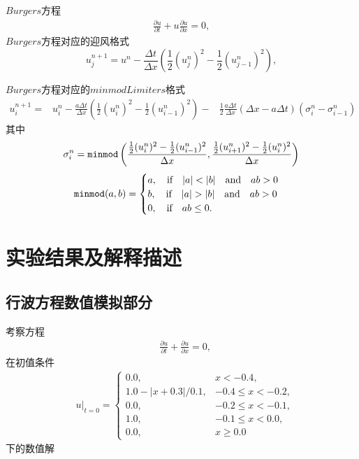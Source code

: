 \documentclass[10.5pt
]{article}
\begin{document}
$Burgers$方程
\begin{align}
\frac{\partial u}{\partial t} + u \frac{\partial u}{\partial x} = 0, \label{EqnBurgers}
\end{align}
$Burgers$方程对应的迎风格式
\begin{equation}
u_j^{n+1} = u^n - \frac{\Delta t}{\Delta x} \left( \frac{1}{2} (u_j^n)^2 - \frac{1}{2} (u_{j-1}^n)^2\right), \label{EqnUpwind}
\end{equation}

$Burgers$方程对应的$minmod Limiters$格式
\begin{equation}
\begin{aligned}
u_i^{n+1}=&
  u_i^n-\frac{a \Delta t}{\Delta x}\left( \frac{1}{2} (u_i^n)^2- \frac{1}{2} (u_{i-1}^n)^2 \right)-
 &\frac{1}{2} \frac{a \Delta t}{\Delta x}(\Delta x-a \Delta t)\left(\sigma_i^n-\sigma_{i-1}^n\right)
\end{aligned}
\end{equation}
其中
\begin{equation}
	\sigma_i^n = \verb|minmod| \left( \frac{ \frac{1}{2} (u_i^n)^2 - \frac{1}{2} (u_{i-1}^{n})^2 }{ \Delta x }, \frac{ \frac{1}{2} (u_{i+1}^n)^2 - \frac{1}{2} (u_{i}^{n})^2}{ \Delta x } \right)
\end{equation}
\begin{equation}
	\verb|minmod|(a, b) = 
	\begin{cases}
		a, \qif |a| < |b| \qand ab > 0\\
		b, \qif |a| > |b| \qand ab > 0\\
		0, \qif ab \leq 0.
	\end{cases}
\end{equation}


\section{实验结果及解释描述}
\subsection{行波方程数值模拟部分}
考察方程
\begin{align}
& \frac{\partial u}{\partial t} + \frac{\partial u}{\partial x} = 0,
\label{EqnCon}
\end{align}
在初值条件
\begin{align}
& u|_{t=0} = \left\{\begin{array}{ll} 0.0, & x < -0.4, \\
1.0 - |x + 0.3| / 0.1, & -0.4 \le x < -0.2, \\
0.0, & -0.2 \le x < -0.1, \\
1.0 , & -0.1 \le x < 0.0, \\
0.0, & x \ge 0.0
\end{array}\right.
\end{align}
下的数值解
\end{document}
